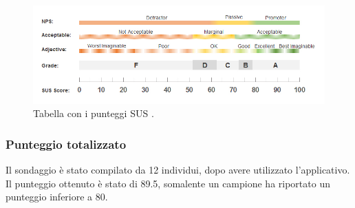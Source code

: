\begin{figure}[h]
  \includegraphics[width=\linewidth]{img/sus.jpg}
  \caption{Tabella con i punteggi SUS \cite{sus}.}
  \label{fig:sus}
\end{figure}

\subsubsection{Punteggio totalizzato}
Il sondaggio è stato compilato da 12 individui, dopo avere utilizzato l'applicativo.
Il punteggio ottenuto è stato di 89.5, somalente un campione ha riportato un punteggio inferiore a 80.

